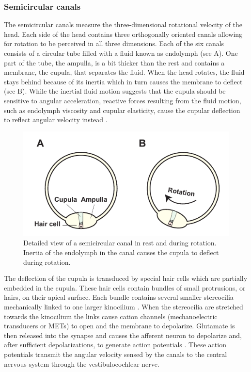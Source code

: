 \subsubsection{Semicircular canals}

The semicircular canals measure the three-dimensional rotational velocity of the head. Each side of the head contains three orthogonally oriented canals allowing for rotation to be perceived in all three dimensions. Each of the six canals consists of a circular tube filled with a fluid known as endolymph (see A). One part of the tube, the ampulla, is a bit thicker than the rest and contains a membrane, the cupula, that separates the fluid. When the head rotates, the fluid stays behind because of its inertia which in turn causes the membrane to deflect (see B). While the inertial fluid motion suggests that the cupula should be sensitive to angular acceleration, reactive forces resulting from the fluid motion, such as endolymph viscosity and cupular elasticity,  cause the cupular deflection to reflect angular velocity instead \cite{goldberg2012}.

\begin{figure}
    \includegraphics[width=1.0\textwidth]{src/intro/figures/canals.pdf}
    \caption{Detailed view of a semicircular canal  in rest and  during rotation. Inertia of the endolymph in the canal causes the cupula to deflect during rotation.}
    \label{intro:fig3}
\end{figure}

The deflection of the cupula is transduced by special hair cells which are partially embedded in the cupula. These hair cells contain bundles of small protrusions, or hairs, on their apical surface. Each bundle contains several smaller stereocilia mechanically linked to one larger kinocilium \cite{pickles1984}. When the stereocilia are stretched towards the kinocilium the links cause cation channels (mechanoelectric transducers or METs) to open and the membrane to depolarize. Glutamate is then released into the synapse and causes the afferent neuron to depolarize and, after sufficient depolarizations, to generate action potentials \cite{purves2012}. These action potentials transmit the angular velocity sensed by the canals to the central nervous system through the  vestibulocochlear nerve.

